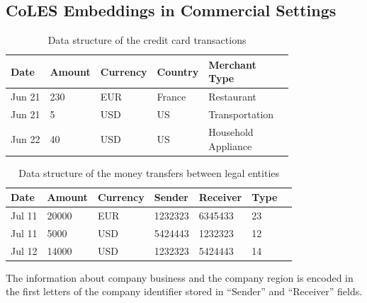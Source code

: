 \documentclass[sigconf, anonymous]{acmart}
\begin{document}
\subsection{CoLES Embeddings in Commercial Settings} \label{sec-commercial}

\begin{table}
    \centering
    \caption{Data structure of the credit card transactions}
    \begin{tabular}{llllll}
        \toprule
            \textbf{Date}
            & \textbf{Amount}
            & \textbf{Currency}
            & \textbf{Country}
            & \makecell{\textbf{Merchant} \\ \textbf{Type}}
            \\
        \midrule
            Jun 21 & 230 & EUR & France & Restaurant \\
            Jun 21 & 5 & USD & US & Transportation \\
            Jun 22 & 40 & USD & US & \makecell[l]{Household \\ Appliance} \\
        \bottomrule
    \end{tabular}
    \label{tab-tr-data}
\end{table}

\begin{table}
    \centering
    \caption{Data structure of the money transfers between legal entities}
    \begin{tabular}{lllllll}
        \toprule
            \textbf{Date}
            & \textbf{Amount}
            & \textbf{Currency}
            & \textbf{Sender}
            & \textbf{Receiver}
            & \textbf{Type}
            \\
        \midrule
            Jul 11 & 20000 & EUR & 1232323 & 6345433 & 23 \\
            Jul 11 & 5000 & USD & 5424443 & 1232323 & 12 \\
            Jul 12 & 14000 & USD & 1232323 & 5424443 & 14 \\
        \bottomrule
    \end{tabular}
    \small{
        The information about company business and the company region is encoded
        in the first letters of the company identifier stored in ``Sender'' and
        ``Receiver'' fields.
    }
\label{tab-org-tr-data}
\end{table}
\end{document}
